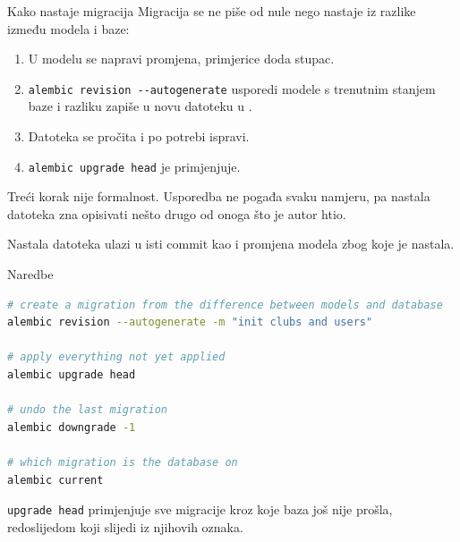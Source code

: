 \begin{frame}{Kako nastaje migracija}
Migracija se ne piše od nule nego nastaje iz razlike između modela i baze:

\vspace{0.4em}
\begin{enumerate}
  \item U modelu se napravi promjena, primjerice doda stupac.
  \item \texttt{alembic revision -{}-autogenerate} usporedi modele s trenutnim stanjem baze i razliku zapiše u novu datoteku u .
  \item Datoteka se pročita i po potrebi ispravi.
  \item \texttt{alembic upgrade head} je primjenjuje.
\end{enumerate}

\vspace{0.4em}
Treći korak nije formalnost. Usporedba ne pogađa svaku namjeru, pa nastala datoteka zna opisivati nešto drugo od onoga što je autor htio.

\vspace{0.3em}
Nastala datoteka ulazi u isti commit kao i promjena modela zbog koje je nastala.
\end{frame}

\begin{frame}[fragile]{Naredbe}
\begin{lstlisting}[language=bash]
# create a migration from the difference between models and database
alembic revision --autogenerate -m "init clubs and users"

# apply everything not yet applied
alembic upgrade head

# undo the last migration
alembic downgrade -1

# which migration is the database on
alembic current
\end{lstlisting}

\vspace{0.4em}
\texttt{upgrade head} primjenjuje sve migracije kroz koje baza još nije prošla, redoslijedom koji slijedi iz njihovih oznaka.
\end{frame}

